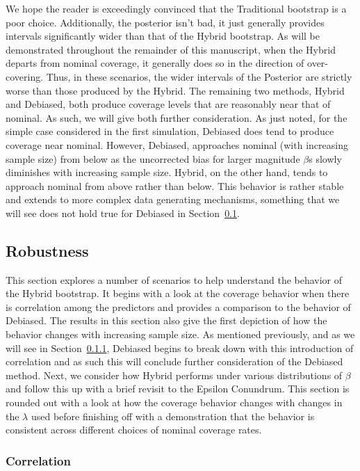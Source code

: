 We hope the reader is exceedingly convinced that the Traditional bootstrap is a poor choice. Additionally, the posterior isn't bad, it just generally provides intervals significantly wider than that of the Hybrid bootstrap. As will be demonstrated throughout the remainder of this manuscript, when the Hybrid departs from nominal coverage, it generally does so in the direction of over-covering. Thus, in these scenarios, the wider intervals of the Posterior are strictly worse than those produced by the Hybrid. The remaining two methods, Hybrid and Debiased, both produce coverage levels that are reasonably near that of nominal. As such, we will give both further consideration. As just noted, for the simple case considered in the first simulation, Debiased does tend to produce coverage near nominal. However, Debiased, approaches nominal (with increasing sample size) from below as the uncorrected bias for larger magnitude $\beta$s slowly diminishes with increasing sample size. Hybrid, on the other hand, tends to approach nominal from above rather than below. This behavior is rather stable and extends to more complex data generating mechanisms, something that we will see does not hold true for Debiased in Section~\ref{Sec:robustness}.

\subsection{Robustness}
\label{Sec:robustness}

This section explores a number of scenarios to help understand the behavior of the Hybrid bootstrap. It begins with a look at the coverage behavior when there is correlation among the predictors and provides a comparison to the behavior of Debiased. The results in this section also give the first depiction of how the behavior changes with increasing sample size. As mentioned previously, and as we will see in Section~\ref{Sec:correlation}, Debiased begins to break down with this introduction of correlation and as such this will conclude further consideration of the Debiased method. Next, we consider how Hybrid performs under various distributions of $\beta$ and follow this up with a brief revisit to the Epsilon Conundrum. This section is rounded out with a look at how the coverage behavior changes with changes in the $\lambda$ used before finishing off with a demonstration that the behavior is consistent across different choices of nominal coverage rates.

\subsubsection{Correlation}
\label{Sec:correlation}

